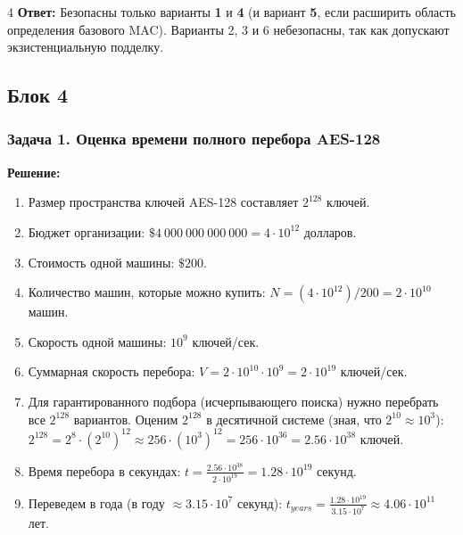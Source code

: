 ﻿\documentclass[8pt,a4paper,landscape]{extarticle}
\newcommand{\tightlist}{}
\begin{document}
\begin{multicols*}{4}
\textbf{Ответ:} Безопасны только варианты \textbf{1} и \textbf{4} (и вариант \textbf{5}, если расширить область определения базового MAC). Варианты 2, 3 и 6 небезопасны, так как допускают экзистенциальную подделку.

\subsection{Блок 4}\label{ux431ux43bux43eux43a-4}

\subsubsection{Задача 1. Оценка времени полного перебора AES-128}\label{ux437ux430ux434ux430ux447ux430-1.-ux43eux446ux435ux43dux43aux430-ux432ux440ux435ux43cux435ux43dux438-ux43fux43eux43bux43dux43eux433ux43e-ux43fux435ux440ux435ux431ux43eux440ux430-aes-128}

\textbf{Решение:}

\begin{enumerate}
\def\labelenumi{\arabic{enumi}.}
\tightlist
\item
  Размер пространства ключей AES-128 составляет \(2^{128}\) ключей.
\item
  Бюджет организации: \(\$4\ 000\ 000\ 000\ 000 = 4 \cdot 10^{12}\) долларов.
\item
  Стоимость одной машины: \(\$200\).
\item
  Количество машин, которые можно купить: \(N = (4 \cdot 10^{12}) / 200 = 2 \cdot 10^{10}\) машин.
\item
  Скорость одной машины: \(10^9\) ключей/сек.
\item
  Суммарная скорость перебора: \(V = 2 \cdot 10^{10} \cdot 10^9 = 2 \cdot 10^{19}\) ключей/сек.
\item
  Для гарантированного подбора (исчерпывающего поиска) нужно перебрать все \(2^{128}\) вариантов. Оценим \(2^{128}\) в десятичной системе (зная, что \(2^{10} \approx 10^3\)): \(2^{128} = 2^8 \cdot (2^{10})^{12} \approx 256 \cdot (10^3)^{12} = 256 \cdot 10^{36} = 2.56 \cdot 10^{38}\) ключей.
\item
  Время перебора в секундах: \(t = \frac{2.56 \cdot 10^{38}}{2 \cdot 10^{19}} = 1.28 \cdot 10^{19}\) секунд.
\item
  Переведем в года (в году \(\approx 3.15 \cdot 10^7\) секунд): \(t_{years} = \frac{1.28 \cdot 10^{19}}{3.15 \cdot 10^7} \approx 4.06 \cdot 10^{11}\) лет.
\end{enumerate}


\end{multicols*}
\end{document}
